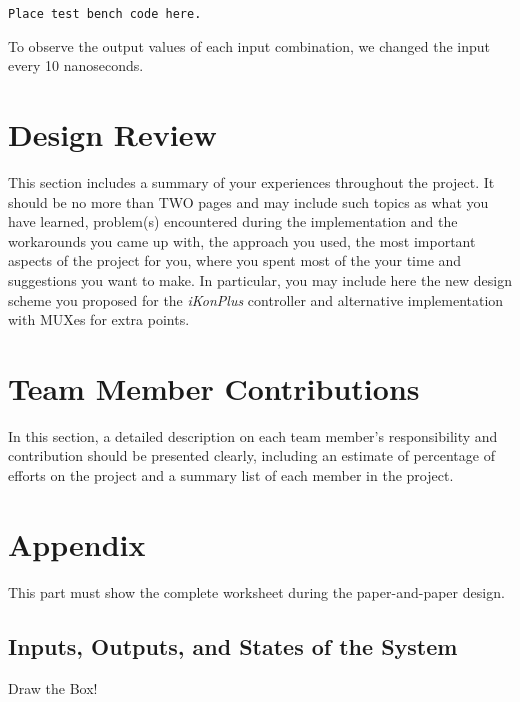 \documentclass{article}
\begin{document}
\begin{verbatim}
Place test bench code here.
\end{verbatim}

To observe the output values of each input combination, we changed the input 
every 10 nanoseconds.


\section{Design Review}
This section includes a summary of your experiences throughout the project. 
It should be no more than TWO pages and may include such topics as what you 
have learned, problem(s) encountered during the implementation and the 
workarounds you came up with, the approach you used, the most important aspects 
of the project for you, where you spent most of the your time and suggestions 
you want to make. In particular, you may include here the new design scheme 
you proposed for the \textit{iKonPlus} controller and alternative 
implementation with MUXes for extra points.


\section{Team Member Contributions}
In this section, a detailed description on each team member's responsibility 
and contribution should be presented clearly, including an estimate of 
percentage of efforts on the project and a summary list of each member in the 
project.


\section{Appendix}
This part must show the complete worksheet during the paper-and-paper design.

\subsection{Inputs, Outputs, and States of the System}
Draw the Box!
\end{document}
